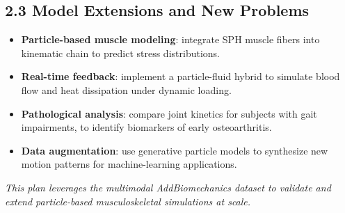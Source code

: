 \documentclass[11pt]{article}
\begin{document}
\subsection*{2.3 Model Extensions and New Problems}
\begin{itemize}
  \item \textbf{Particle-based muscle modeling}: integrate SPH muscle fibers into kinematic chain to predict stress distributions.
  \item \textbf{Real-time feedback}: implement a particle-fluid hybrid to simulate blood flow and heat dissipation under dynamic loading.
  \item \textbf{Pathological analysis}: compare joint kinetics for subjects with gait impairments, to identify biomarkers of early osteoarthritis.
  \item \textbf{Data augmentation}: use generative particle models to synthesize new motion patterns for machine-learning applications.
\end{itemize}

\vfill
\noindent\textit{This plan leverages the multimodal AddBiomechanics dataset to validate and extend particle-based musculoskeletal simulations at scale.}
\end{document}
